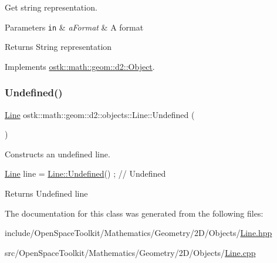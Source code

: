 Get string representation. 


\begin{DoxyParams}[1]{Parameters}
\mbox{\tt in}  & {\em a\+Format} & A format \\
\hline
\end{DoxyParams}
\begin{DoxyReturn}{Returns}
String representation 
\end{DoxyReturn}


Implements \hyperlink{classostk_1_1math_1_1geom_1_1d2_1_1_object_ada4c2187dd24ef02b91b6346191f677c}{ostk\+::math\+::geom\+::d2\+::\+Object}.

\mbox{\label{classostk_1_1math_1_1geom_1_1d2_1_1objects_1_1_line_a972021efa1daf10a576115b1b74614f0}} 
\subsubsection{\texorpdfstring{Undefined()}{Undefined()}}
{\footnotesize\ttfamily \hyperlink{classostk_1_1math_1_1geom_1_1d2_1_1objects_1_1_line}{Line} ostk\+::math\+::geom\+::d2\+::objects\+::\+Line\+::\+Undefined (\begin{DoxyParamCaption}{ }\end{DoxyParamCaption})\hspace{0.3cm}{\ttfamily [static]}}



Constructs an undefined line. 


\begin{DoxyCode}
\hyperlink{classostk_1_1math_1_1geom_1_1d2_1_1objects_1_1_line_aa1570ebec4d4f57cbed3c188e6b65613}{Line} line = \hyperlink{classostk_1_1math_1_1geom_1_1d2_1_1objects_1_1_line_a972021efa1daf10a576115b1b74614f0}{Line::Undefined}() ; \textcolor{comment}{// Undefined}
\end{DoxyCode}


\begin{DoxyReturn}{Returns}
Undefined line 
\end{DoxyReturn}


The documentation for this class was generated from the following files\+:\begin{DoxyCompactItemize}
\item 
include/\+Open\+Space\+Toolkit/\+Mathematics/\+Geometry/2\+D/\+Objects/\hyperlink{2_d_2_objects_2_line_8hpp}{Line.\+hpp}\item 
src/\+Open\+Space\+Toolkit/\+Mathematics/\+Geometry/2\+D/\+Objects/\hyperlink{2_d_2_objects_2_line_8cpp}{Line.\+cpp}\end{DoxyCompactItemize}
